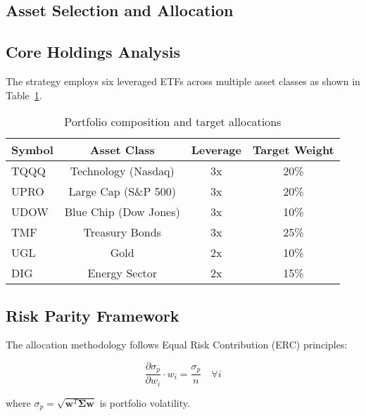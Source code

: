 \documentclass[11pt]{IEEEtran}
\begin{document}
\begin{multicols}{2}

\section{Asset Selection and Allocation}

\subsection{Core Holdings Analysis}

The strategy employs six leveraged ETFs across multiple asset classes as shown in Table~\ref{tab:holdings}.

\end{multicols}

\begin{table}[h]
\centering
\begin{tabular}{lccc}
\toprule
Symbol & Asset Class & Leverage & Target Weight \\
\midrule
TQQQ & Technology (Nasdaq) & 3x & 20\% \\
UPRO & Large Cap (S\&P 500) & 3x & 20\% \\
UDOW & Blue Chip (Dow Jones) & 3x & 10\% \\
TMF & Treasury Bonds & 3x & 25\% \\
UGL & Gold & 2x & 10\% \\
DIG & Energy Sector & 2x & 15\% \\
\bottomrule
\end{tabular}
\caption{Portfolio composition and target allocations}
\label{tab:holdings}
\end{table}

\begin{multicols}{2}

\subsection{Risk Parity Framework}

The allocation methodology follows Equal Risk Contribution (ERC) principles:

\end{multicols}

\begin{equation}
\frac{\partial \sigma_p}{\partial w_i} \cdot w_i = \frac{\sigma_p}{n} \quad \forall i
\end{equation}

where $\sigma_p = \sqrt{\mathbf{w}^T \boldsymbol{\Sigma} \mathbf{w}}$ is portfolio volatility.
\end{document}
